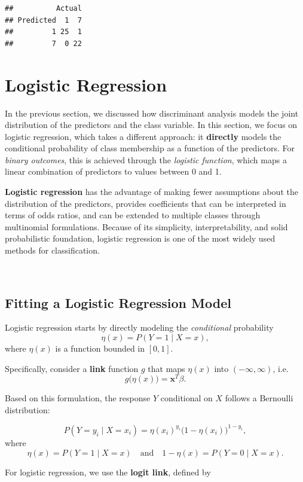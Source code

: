 \documentclass[
]{book}
\begin{document}
\begin{verbatim}
##          Actual
## Predicted  1  7
##         1 25  1
##         7  0 22
\end{verbatim}

\chapter{Logistic Regression}\label{logistic-regression}

In the previous section, we discussed how discriminant analysis models the joint distribution of the predictors and the class variable. In this section, we focus on logistic regression, which takes a different approach: it \textbf{directly} models the conditional probability of class membership as a function of the predictors. For \emph{binary outcomes}, this is achieved through the \emph{logistic function}, which maps a linear combination of predictors to values between 0 and 1.

\textbf{Logistic regression} has the advantage of making fewer assumptions about the distribution of the predictors, provides coefficients that can be interpreted in terms of odds ratios, and can be extended to multiple classes through multinomial formulations. Because of its simplicity, interpretability, and solid probabilistic foundation, logistic regression is one of the most widely used methods for classification.

~

\section{Fitting a Logistic Regression Model}\label{fitting-a-logistic-regression-model}

Logistic regression starts by directly modeling the \emph{conditional} probability
\[\eta(x) = P(Y=1 \mid X=x),\]
where \(\eta(x)\) is a function bounded in \([0,1]\).

Specifically, consider a \textbf{link} function \(g\) that maps \(\eta(x)\) into \((-\infty, \infty)\), i.e.
\[g\bigl(\eta(x)\bigr) = \mathbf{x}^T \beta.\]

Based on this formulation, the response \(Y\) conditional on \(X\) follows a Bernoulli distribution:

\[P(Y = y_i \mid X=x_i) = \eta(x_i)^{y_i} \bigl(1- \eta(x_i)\bigr)^{1-y_i},\]
where
\[\eta(x) = P(Y=1 \mid X=x) \quad \text{and} \quad 1-\eta(x) = P(Y=0 \mid X=x).\]

For logistic regression, we use the \textbf{logit link}, defined by
\end{document}
